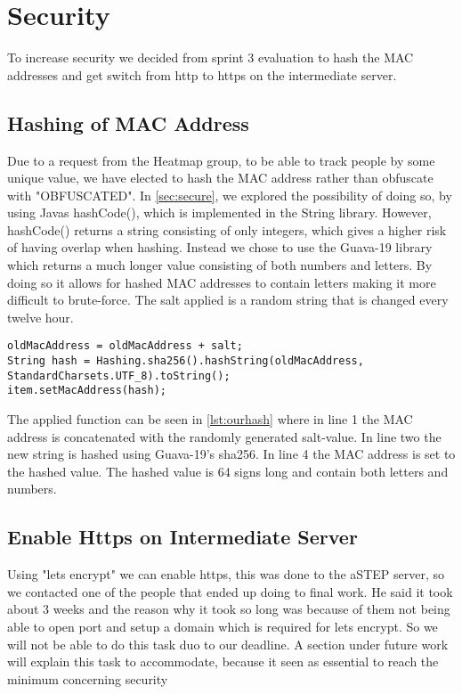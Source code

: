\section*{Security}
To increase security we decided from sprint 3 evaluation to hash the MAC addresses and get switch from http to https on the intermediate server.

\subsection*{Hashing of MAC Address}
Due to a request from the Heatmap group, to be able to track people by some unique value, we have elected to hash the MAC address rather than obfuscate with "OBFUSCATED". In \cref{sec:secure}, we explored the possibility of doing so, by using Javas hashCode(), which is implemented in the String library. However, hashCode() returns a string consisting of only integers, which gives a higher risk of having overlap when hashing. Instead we chose to use the Guava-19 library which returns a much longer value consisting of both numbers and letters. By doing so it allows for hashed MAC addresses to contain letters making it more difficult to brute-force. The salt applied is a random string that is changed every twelve hour. 

\begin{lstlisting}[caption={Hashing a MAC address},label={lst:ourhash},language=inc_Java]
oldMacAddress = oldMacAddress + salt;
String hash = Hashing.sha256().hashString(oldMacAddress, 
StandardCharsets.UTF_8).toString();
item.setMacAddress(hash);
\end{lstlisting}

The applied function can be seen in \cref{lst:ourhash} where in line 1 the MAC address is concatenated with the randomly generated salt-value. In line two the new string is hashed using Guava-19's sha256. In line 4 the MAC address is set to the hashed value. The hashed value is 64 signs long and contain both letters and numbers.

\subsection*{Enable Https on Intermediate Server}
Using "lets encrypt" we can enable https, this was done to the aSTEP server, so we contacted one of the people that ended up doing to final work. He said it took about 3 weeks and the reason why it took so long was because of them not being able to open port and setup a domain which is required for lets encrypt. So we will not be able to do this task duo to our deadline. A section under future work will explain this task to accommodate, because it seen as essential to reach the minimum concerning security